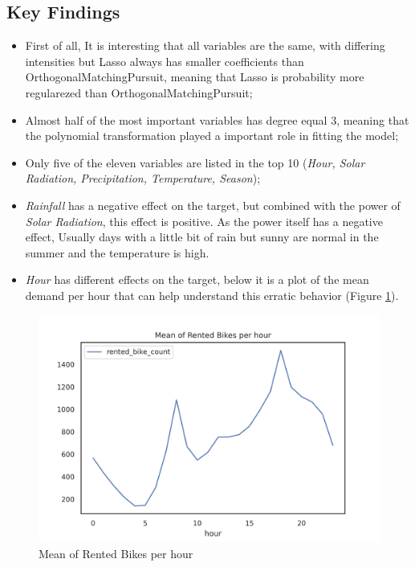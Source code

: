 \documentclass[11pt, a4]{article}
\begin{document}
\subsection*{Key Findings}

\begin{itemize}
\item First of all, It is interesting that all variables are the same, with differing intensities but Lasso always has smaller coefficients than OrthogonalMatchingPursuit, meaning that Lasso is probability more regularezed than  OrthogonalMatchingPursuit;
\item Almost half of the most important variables has degree equal 3, meaning that the polynomial transformation played a important role in fitting the model;
\item Only five of the eleven variables are listed in the top 10 (\textit{Hour, Solar Radiation, Precipitation, Temperature, Season});
\item \textit{Rainfall} has a negative effect on the target, but combined with the power of \textit{Solar Radiation}, this effect is positive. As the power itself has a negative effect, Usually  days with a little bit of rain but sunny are normal in the summer and the temperature is high.
\item \textit{Hour} has different effects on the target, below it is a plot of the mean demand per hour that can help understand this erratic behavior (Figure \ref{fig:rented}).
\end{itemize}

\begin{figure}[!h]
\includegraphics[]{rented}
\centering
\caption{Mean of Rented Bikes per hour}
\label{fig:rented}
\end{figure}
\end{document}
